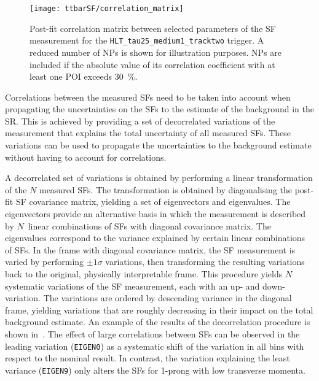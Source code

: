 \begin{figure}[htbp]
  \centering

  \texttt{[image: ttbarSF/correlation\_matrix]}

  \caption[Post-fit correlation matrix between selected parameters of the
  \faketauhadvis SF measurement for the \texttt{HLT\_tau25\_medium1\_tracktwo}
  trigger.]{Post-fit correlation matrix between selected parameters of the
    \faketauhadvis SF measurement for the \texttt{HLT\_tau25\_medium1\_tracktwo}
    trigger. A reduced number of NPs is shown for illustration purposes. NPs are
    included if the absolute value of its correlation coefficient with at least
    one POI exceeds \SI{30}{\percent}.}%
  \label{fig:ttbarSF_corr_matrix}
\end{figure}

Correlations between the measured SFs need to be taken into account when
propagating the uncertainties on the SFs to the estimate of the \ttbarFakes
background in the \hadhad SR. This is achieved by providing a set of
decorrelated variations of the measurement that explains the total uncertainty
of all measured SFs. These variations can be used to propagate the uncertainties
to the background estimate without having to account for correlations.

A decorrelated set of variations is obtained by performing a linear
transformation of the $N$ measured SFs. The transformation is obtained by
diagonalising the post-fit SF covariance matrix, yielding a set of eigenvectors
and eigenvalues. The eigenvectors provide an alternative basis in which the
measurement is described by $N$~linear combinations of SFs with diagonal
covariance matrix. The eigenvalues correspond to the variance explained by
certain linear combinations of SFs.
In the frame with diagonal covariance matrix, the SF measurement is varied by
performing $\pm 1 \sigma$ variations, then transforming the resulting variations
back to the original, physically interpretable frame. This procedure yields $N$
systematic variations of the SF measurement, each with an up- and
down-variation. The variations are ordered by descending variance in the
diagonal frame, yielding variations that are roughly decreasing in their impact
on the total \ttbarFakes background estimate. An example of the results of the
decorrelation procedure is shown in~. The
effect of large correlations between SFs can be observed in the leading
variation (\texttt{EIGEN0}) as a systematic shift of the variation in all bins
with respect to the nominal result. In contrast, the variation explaining the
least variance (\texttt{EIGEN9}) only alters the SFs for 1-prong \faketauhadvis
with low transverse momenta.

